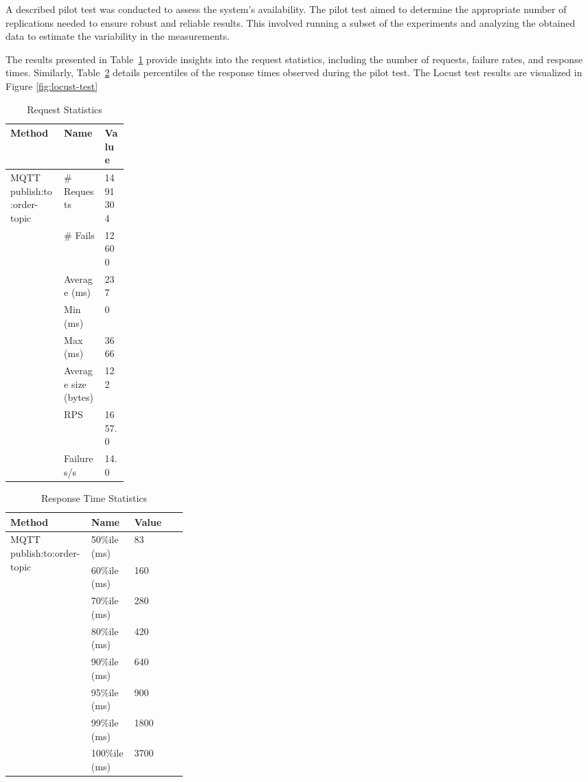 \documentclass[conference]{IEEEtran}
\begin{document}
A described pilot test was conducted to assess the system's availability. The pilot test aimed to determine the appropriate number of replications needed to ensure robust and reliable results. This involved running a subset of the experiments and analyzing the obtained data to estimate the variability in the measurements.

The results presented in Table~\ref{table:request-stats} provide insights into the request statistics, including the number of requests, failure rates, and response times. Similarly, Table~\ref{table:response-time-stats} details percentiles of the response times observed during the pilot test. The Locust test results are visualized in Figure \ref{fig:locust-test}

\begin{table}[H]
    \centering
    \begin{tabular}{|l|l|p{0.2\linewidth}|}
        \hline
        \textbf{Method} & \textbf{Name} & \textbf{Value} \\
        \hline
        \multirow{2}{*}{MQTT publish:to:order-topic} & \# Requests & 1491304 \\
        \cline{2-3}
        & \# Fails & 12600 \\
        \cline{2-3}
        & Average (ms) & 237 \\
        \cline{2-3}
        & Min (ms) & 0 \\
        \cline{2-3}
        & Max (ms) & 3666 \\
        \cline{2-3}
        & Average size (bytes) & 122 \\
        \cline{2-3}
        & RPS & 1657.0 \\
        \cline{2-3}
        & Failures/s & 14.0 \\
        \hline
    \end{tabular}
    \caption{Request Statistics}
    \label{table:request-stats}
\end{table}

\begin{table}[H]
    \centering
    \begin{tabular}{|l|l|p{0.3\linewidth}|}
        \hline
        \textbf{Method} & \textbf{Name} & \textbf{Value} \\
        \hline
        \multirow{2}{*}{MQTT publish:to:order-topic} & 50\%ile (ms) & 83 \\
        \cline{2-3}
        & 60\%ile (ms) & 160 \\
        \cline{2-3}
        & 70\%ile (ms) & 280 \\
        \cline{2-3}
        & 80\%ile (ms) & 420 \\
        \cline{2-3}
        & 90\%ile (ms) & 640 \\
        \cline{2-3}
        & 95\%ile (ms) & 900 \\
        \cline{2-3}
        & 99\%ile (ms) & 1800 \\
        \cline{2-3}
        & 100\%ile (ms) & 3700 \\
        \hline
    \end{tabular}
    \caption{Response Time Statistics}
    \label{table:response-time-stats}
\end{table}
\end{document}

